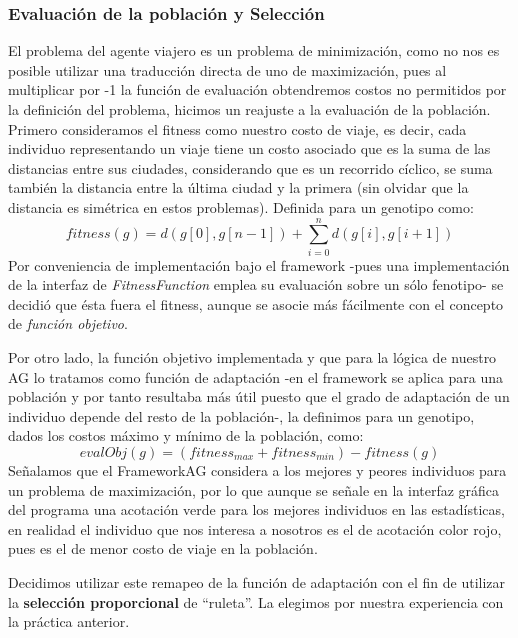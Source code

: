\documentclass[12pt]{article}
\begin{document}
\subsubsection*{Evaluación de la población y Selección}
El problema del agente viajero es un problema de minimización,
como no nos es posible utilizar una traducción directa de uno de maximización,
pues al multiplicar por -1 la función de evaluación obtendremos
costos no permitidos por la definición del problema, hicimos un reajuste a
la evaluación de la población.
Primero consideramos el fitness como nuestro costo de viaje, es decir, cada
individuo representando un viaje tiene un costo asociado que es la suma de
las distancias entre sus ciudades, considerando que es un recorrido cíclico,
se suma también la distancia entre la última ciudad y la primera (sin olvidar
que la distancia es simétrica en estos problemas). Definida para un genotipo como:
\begin{equation}
  fitness(g) = d(g[0],g[n-1]) + \sum\limits_{i=0}^{n} d(g[i],g[i+1])
\end{equation}
Por conveniencia de implementación bajo el framework -pues una implementación de
la interfaz de \textit{FitnessFunction} emplea su evaluación sobre un sólo
fenotipo- se decidió que ésta fuera
el fitness, aunque se asocie más fácilmente con el concepto de \textit{función objetivo}.\par
Por otro lado, la función objetivo implementada y que para la lógica de
nuestro AG lo tratamos como función de adaptación -en el framework se aplica para una población
y por tanto resultaba más útil puesto que el grado de adaptación de un individuo
depende del resto de la población-, la definimos para un genotipo, dados los costos máximo
y mínimo de la población, como:
\begin{equation}
  evalObj(g) = (fitness_{max} + fitness_{min})-fitness(g)
\end{equation}
Señalamos que el FrameworkAG considera a los mejores y peores individuos para
un problema de maximización, por lo que aunque se señale en la interfaz gráfica
del programa una acotación verde para los mejores individuos en las estadísticas,
en realidad el individuo que nos interesa a nosotros es el de acotación color
rojo, pues es el de menor costo de viaje en la población.\par

Decidimos utilizar este remapeo de la función de adaptación con el fin de
utilizar la \textbf{selección proporcional} de ``ruleta''. La elegimos por
nuestra experiencia con la práctica anterior.
\end{document}
